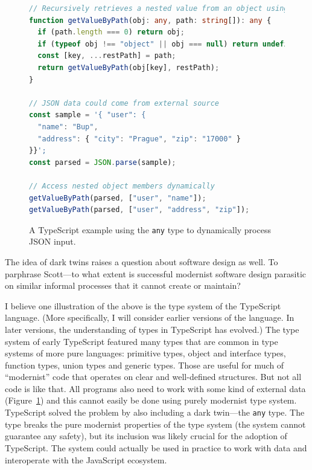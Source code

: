 
\begin{figure}
\begin{lstlisting}[language=ts]
// Recursively retrieves a nested value from an object using a path
function getValueByPath(obj: any, path: string[]): any {
  if (path.length === 0) return obj;
  if (typeof obj !== "object" || obj === null) return undefined;
  const [key, ...restPath] = path;
  return getValueByPath(obj[key], restPath);
}

// JSON data could come from external source
const sample = '{ "user": {
  "name": "Bup",
  "address": { "city": "Prague", "zip": "17000" }
}}';
const parsed = JSON.parse(sample);

// Access nested object members dynamically
getValueByPath(parsed, ["user", "name"]);
getValueByPath(parsed, ["user", "address", "zip"]);
\end{lstlisting}
\caption{A TypeScript example using the \texttt{any} type to dynamically process JSON input.}
\label{fig:any}
\end{figure}

The idea of dark twins raises a question about software design as well. To parphrase Scott---to
what extent is successful modernist software design parasitic on similar informal processes that
it cannot create or maintain?

I believe one illustration of the above is the type system of the TypeScript language.
(More specifically, I will consider earlier versions of the language. In later versions, the
understanding of types in TypeScript has evolved.) The type system of early TypeScript
featured many types that are common in type systems of more pure languages: primitive types,
object and interface types, function types, union types and generic types. Those are useful
for much of ``modernist'' code that operates on clear and well-defined structures. But not
all code is like that. All programs also need to work with some kind of external data
(Figure~\ref{fig:any}) and this cannot easily be done using purely modernist type system.
TypeScript solved the problem by also including a dark twin---the \texttt{any} type. The type
breaks the pure modernist properties of the type system (the system cannot guarantee any safety),
but its inclusion was likely crucial for the adoption of TypeScript. The system could actually
be used in practice to work with data and interoperate with the JavaScript ecosystem.

